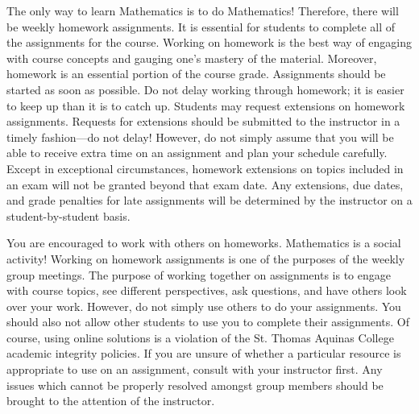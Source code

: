 \documentclass[11pt,letterpaper]{article}
\begin{document}
The only way to learn Mathematics is to do Mathematics! Therefore, there will be weekly homework assignments. It is essential for students to complete all of the assignments for the course. Working on homework is the best way of engaging with course concepts and gauging one's mastery of the material. Moreover, homework is an essential portion of the course grade. Assignments should be started as soon as possible. Do not delay working through homework; it is easier to keep up than it is to catch up. Students may request extensions on homework assignments. Requests for extensions should be submitted to the instructor in a timely fashion---do not delay! However, do not simply assume that you will be able to receive extra time on an assignment and plan your schedule carefully. Except in exceptional circumstances, homework extensions on topics included in an exam will not be granted beyond that exam date. Any extensions, due dates, and grade penalties for late assignments will be determined by the instructor on a student-by-student basis. \pspace

You are encouraged to work with others on homeworks. Mathematics is a social activity! Working on homework assignments is one of the purposes of the weekly group meetings. The purpose of working together on assignments is to engage with course topics, see different perspectives, ask questions, and have others look over your work. However, do not simply use others to do your assignments. You should also not allow other students to use you to complete their assignments. Of course, using online solutions is a violation of the St. Thomas Aquinas College academic integrity policies. If you are unsure of whether a particular resource is appropriate to use on an assignment, consult with your instructor first. Any issues which cannot be properly resolved amongst group members should be brought to the attention of the instructor. 
\sectionbreak
\end{document}
